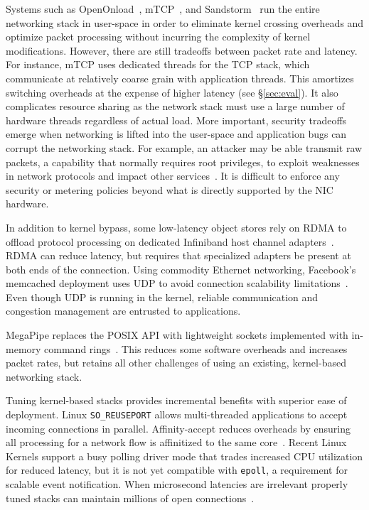  Systems such as
OpenOnload~\cite{openonload}, mTCP~\cite{jeong2014mtcp}, and
Sandstorm~\cite{sandstorm} run the entire networking stack in
user-space in order to eliminate kernel crossing overheads and
optimize packet processing without incurring the complexity of kernel
modifications. However, there are still tradeoffs between packet rate
and latency. For instance, mTCP uses dedicated threads for the TCP
stack, which communicate at relatively coarse grain with application
threads. This amortizes switching overheads at the expense of higher
latency (see \S\ref{sec:eval}). It also complicates resource sharing
as the network stack must use a large number of hardware threads
regardless of actual load. More important, security tradeoffs emerge
when networking is lifted into the user-space and application bugs can
corrupt the networking stack. For example, an attacker may be able
transmit raw packets, a capability that normally requires root
privileges, to exploit weaknesses in network protocols and impact
other services~\cite{DBLP:conf/acsac/Bellovin04}. It is difficult to
enforce any security or metering policies beyond what is directly
supported by the NIC hardware.

 In addition to kernel bypass, some
low-latency object stores rely on RDMA to offload protocol processing
on dedicated Infiniband host channel
adapters~\cite{dragojevic14farm,DBLP:conf/icpp/JoseSLZHWIOWSP11,mitchell:rdma,DBLP:conf/sosp/OngaroRSOR11}.
RDMA can reduce latency, but requires that specialized adapters be present at both ends of the connection.
Using commodity Ethernet
networking, Facebook's memcached deployment uses UDP to avoid
connection scalability
limitations~\cite{DBLP:conf/nsdi/NishtalaFGKLLMPPSSTV13}. Even though
UDP is running in the kernel, reliable communication and congestion
management are entrusted to applications.

 MegaPipe replaces the POSIX
API with lightweight sockets implemented with in-memory command
rings~\cite{DBLP:conf/osdi/HanMCR12}. This reduces some
software overheads and increases packet rates, but retains all other
challenges of using an existing, kernel-based networking stack.

 Tuning kernel-based stacks provides
incremental benefits with superior ease of deployment.  Linux
\texttt{SO\_REUSEPORT} allows multi-threaded applications to accept
incoming connections in parallel. Affinity-accept reduces overheads by
ensuring all processing for a network flow is affinitized to the same
core~\cite{DBLP:conf/eurosys/PesterevSZM12}. Recent Linux Kernels
support a busy polling driver mode that trades increased CPU utilization
for reduced latency, but it is not yet compatible with
\texttt{epoll}, a requirement for scalable event notification.
When microsecond latencies are
irrelevant properly tuned stacks can maintain millions of open
connections~\cite{whatsapp-2mil}.

